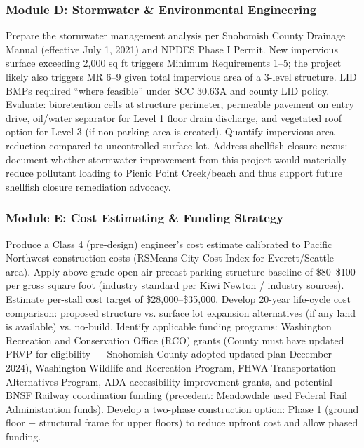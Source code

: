 \documentclass[11pt,letterpaper]{article}
\begin{document}
\subsubsection{Module D: Stormwater \& Environmental Engineering}

Prepare the stormwater management analysis per Snohomish County Drainage Manual (effective July 1, 2021) and NPDES Phase I Permit. New impervious surface exceeding 2,000 sq ft triggers Minimum Requirements 1--5; the project likely also triggers MR 6--9 given total impervious area of a 3-level structure. LID BMPs required ``where feasible'' under SCC 30.63A and county LID policy. Evaluate: bioretention cells at structure perimeter, permeable pavement on entry drive, oil/water separator for Level 1 floor drain discharge, and vegetated roof option for Level 3 (if non-parking area is created). Quantify impervious area reduction compared to uncontrolled surface lot. Address shellfish closure nexus: document whether stormwater improvement from this project would materially reduce pollutant loading to Picnic Point Creek/beach and thus support future shellfish closure remediation advocacy.

\subsubsection{Module E: Cost Estimating \& Funding Strategy}

Produce a Class 4 (pre-design) engineer's cost estimate calibrated to Pacific Northwest construction costs (RSMeans City Cost Index for Everett/Seattle area). Apply above-grade open-air precast parking structure baseline of \$80--\$100 per gross square foot (industry standard per Kiwi Newton / industry sources). Estimate per-stall cost target of \$28,000--\$35,000. Develop 20-year life-cycle cost comparison: proposed structure vs. surface lot expansion alternatives (if any land is available) vs. no-build. Identify applicable funding programs: Washington Recreation and Conservation Office (RCO) grants (County must have updated PRVP for eligibility --- Snohomish County adopted updated plan December 2024), Washington Wildlife and Recreation Program, FHWA Transportation Alternatives Program, ADA accessibility improvement grants, and potential BNSF Railway coordination funding (precedent: Meadowdale used Federal Rail Administration funds). Develop a two-phase construction option: Phase 1 (ground floor + structural frame for upper floors) to reduce upfront cost and allow phased funding.
\end{document}
